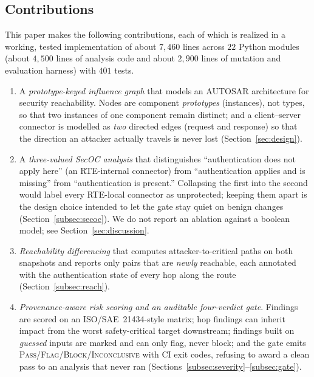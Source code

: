 \documentclass[journal]{IEEEtran}
\begin{document}
\subsection{Contributions}
\label{subsec:contrib}

This paper makes the following contributions, each of which is realized in a
working, tested implementation of about $7{,}460$ lines across $22$ Python
modules (about $4{,}500$ lines of analysis code and about $2{,}900$ lines of
mutation and evaluation harness) with $401$ tests.

\begin{enumerate}
\item A \emph{prototype-keyed influence graph} that models an AUTOSAR
architecture for security reachability. Nodes are component \emph{prototypes}
(instances), not types, so that two instances of one component remain distinct;
and a client--server connector is modelled as \emph{two} directed edges
(request and response) so that the direction an attacker actually travels is
never lost (Section~\ref{sec:design}).

\item A \emph{three-valued SecOC analysis} that distinguishes ``authentication
does not apply here'' (an RTE-internal connector) from ``authentication applies
and is missing'' from ``authentication is present.'' Collapsing the first into
the second would label every RTE-local connector as unprotected; keeping them
apart is the design choice intended to let the gate stay quiet on benign
changes (Section~\ref{subsec:secoc}). We do not report an ablation against a
boolean model; see Section~\ref{sec:discussion}.

\item \emph{Reachability differencing} that computes attacker-to-critical paths
on both snapshots and reports only pairs that are \emph{newly} reachable, each
annotated with the authentication state of every hop along the route
(Section~\ref{subsec:reach}).

\item \emph{Provenance-aware risk scoring and an auditable four-verdict gate}.
Findings are scored on an ISO/SAE~21434-style matrix; hop findings can inherit
impact from the worst safety-critical target downstream; findings built on
\emph{guessed} inputs are marked and can only flag, never block; and the gate
emits \textsc{Pass}/\textsc{Flag}/\textsc{Block}/\textsc{Inconclusive} with CI
exit codes, refusing to award a clean pass to an analysis that never ran
(Sections~\ref{subsec:severity}--\ref{subsec:gate}).


\end{enumerate}
\end{document}
